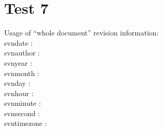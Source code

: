 \documentclass[12pt]{report}
\begin{document}
\chapter{Test 7}
Usage of ``whole document'' revision information:\\

\noindent
 svndate : \svndate  \\
 svnauthor : \svnauthor  \\
 svnyear : \svnyear  \\
 svnmonth : \svnmonth  \\
 svnday : \svnday  \\
 svnhour : \svnhour  \\
 svnminute : \svnminute  \\
 svnsecond : \svnsecond  \\
 svntimezone : \svntimezone  \\
\end{document}
